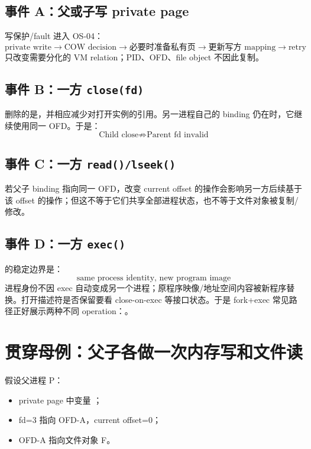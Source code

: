\documentclass[UTF8,fontset=none,11pt,a4paper]{ctexart}
\begin{document}
\subsection{事件 A：父或子写 private page}

写保护/fault 进入 OS-04：
\[
\text{private write}
\to \text{COW decision}
\to \text{必要时准备私有页}
\to \text{更新写方 mapping}
\to \text{retry}
\]
只改变需要分化的 VM relation；PID、OFD、file object 不因此复制。

\subsection{事件 B：一方 \texttt{close(fd)}}

 删除的是，并相应减少对打开实例的引用。另一进程自己的 binding 仍在时，它继续使用同一 OFD。于是：
\[
\boxed{\text{Child close} \not\Rightarrow \text{Parent fd invalid}}
\]

\subsection{事件 C：一方 \texttt{read()/lseek()}}

若父子 binding 指向同一 OFD，改变 current offset 的操作会影响另一方后续基于该 offset 的操作；但这不等于它们共享全部进程状态，也不等于文件对象被复制/修改。

\subsection{事件 D：一方 \texttt{exec()}}

 的稳定边界是：
\[
\boxed{\text{same process identity, new program image}}
\]
进程身份不因 exec 自动变成另一个进程；原程序映像/地址空间内容被新程序替换。打开描述符是否保留要看 close-on-exec 等接口状态。于是 fork+exec 常见路径正好展示两种不同 operation：。

\section{贯穿母例：父子各做一次内存写和文件读}

假设父进程 P：
\begin{itemize}
  \item private page 中变量 ；
  \item fd=3 指向 OFD-A，current offset=0；
  \item OFD-A 指向文件对象 F。
\end{itemize}
\end{document}
